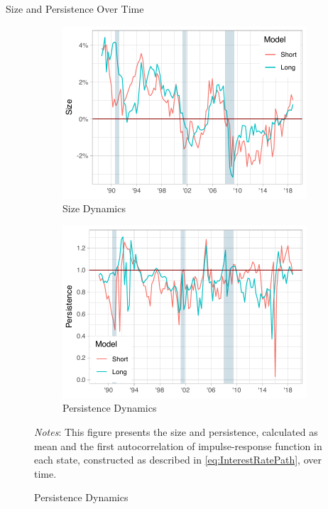 \documentclass[11pt,pdf,aspectratio=129]{beamer}
\begin{document}
\begin{frame}{Size and Persistence Over Time}
    \begin{figure}[!htbp]\centering
        \vspace{-2ex}
        \label{fig:Size_Persistence_Dynamics}
        \begin{subfigure}[b]{0.49\textwidth}
            \centering
            \caption{Size Dynamics}
            \label{fig:AverageResponce}
            \includegraphics[width=\linewidth]{size_plot.pdf}
        \end{subfigure}
        \hfill
        \begin{subfigure}[b]{0.49\textwidth}
            \centering
            \caption{Persistence Dynamics}
            \label{fig:DifferentialResponce}
            \includegraphics[width=\linewidth]{persistence_plot.pdf}
        \end{subfigure} \vspace{-5ex}
            {\begin{flushleft}\tiny\textit{Notes}: This figure presents the size and persistence, calculated as mean and the first autocorrelation of impulse-response function in each state, constructed as described in \vref{eq:InterestRatePath}, over time. \end{flushleft}}
      \end{figure}
      
\end{frame}
\end{document}
